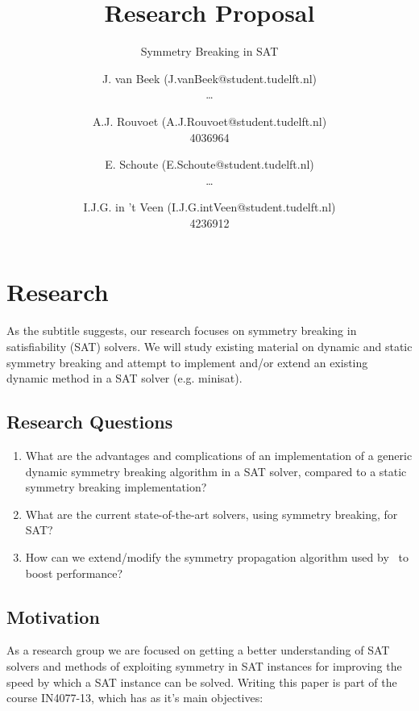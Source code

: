 

	\title{Research Proposal}
	\author{
		J. van Beek (J.vanBeek@student.tudelft.nl) \\ \ldots \and
		A.J. Rouvoet (A.J.Rouvoet@student.tudelft.nl) \\ 4036964 \and
		E. Schoute (E.Schoute@student.tudelft.nl) \\ \ldots \and
		I.J.G. in 't Veen (I.J.G.intVeen@student.tudelft.nl) \\ 4236912
	}

	\subtitle{Symmetry Breaking in SAT}



	\maketitle
	\newpage

	\section{Research}
	As the subtitle suggests, our research focuses on symmetry breaking in satisfiability (SAT) solvers. We will study existing material on dynamic and static symmetry breaking and attempt to implement and/or extend an existing dynamic method in a SAT solver (e.g. minisat).

		\subsection{Research Questions}
		\begin{enumerate}
		\item What are the advantages and complications of an implementation of a generic dynamic	symmetry breaking algorithm in a SAT solver, compared to a static symmetry breaking implementation?
		\item What are the current state-of-the-art solvers, using symmetry breaking, for SAT?
		\item How can we extend/modify the symmetry propagation algorithm used by~\cite{devriendt2012symmetry} to boost performance?
		\end{enumerate}

		\subsection{Motivation}
			As a research group we are focused on getting a better understanding of SAT solvers and methods of exploiting symmetry in SAT instances for improving the speed by which a SAT	instance can be solved.	Writing this paper is part of the course IN4077-13, which has as it's main objectives:

